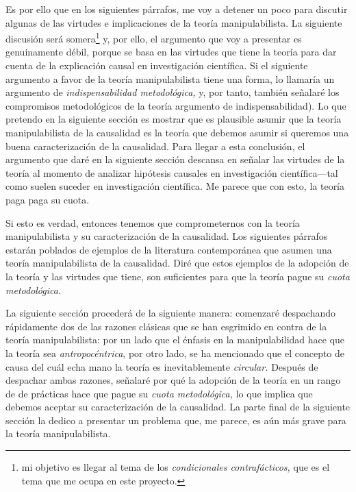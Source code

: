 {{Es por ello que en los siguientes párrafos, me voy a detener
un poco para discutir algunas de las virtudes e
implicaciones de la teoría manipulabilista. La siguiente
discusión será somera\footnote{
  mi objetivo es llegar al tema de los \emph{condicionales
  contrafácticos,} que es el tema que me ocupa en este
  proyecto.
}
y, por ello, el argumento que voy a presentar es genuinamente
débil, porque se basa en las virtudes que tiene la teoría
para dar cuenta de la explicación causal en investigación
científica. Si el siguiente argumento a favor de la teoría
manipulabilista tiene una forma, lo llamaría un argumento de
\emph{indispensabilidad metodológica,} y, por tanto, también
señalaré los compromisos metodológicos de la teoría
argumento de indispensabilidad). Lo que
pretendo en la siguiente sección es mostrar que es plausible asumir que la teoría
manipulabilista de la causalidad es la teoría que debemos
asumir si queremos una buena caracterización de la
causalidad. Para llegar a esta conclusión, el argumento que
daré en la siguiente sección descansa en
señalar las virtudes de la teoría al momento de analizar
hipótesis causales en investigación científica---tal como
suelen suceder en investigación científica. Me parece que
con esto, la teoría paga paga su cuota.

Si esto es verdad, entonces
tenemos que comprometernos con la teoría manipulabilista y
su caracterización de la causalidad. Los siguientes párrafos
estarán poblados de ejemplos de la literatura
contemporánea que asumen una teoría manipulabilista de la
causalidad. Diré que estos ejemplos de la adopción de la
teoría y las virtudes que tiene, son suficientes para que la
teoría pague su \emph{cuota metodológica.}

La siguiente sección procederá de la siguiente manera:
comenzaré despachando rápidamente dos de las razones
clásicas que se han esgrimido en contra de la teoría
manipulabilista: por un lado que el énfasis en la
manipulabilidad hace que la teoría sea
\emph{antropocéntrica}, por otro lado, se ha mencionado
que el concepto de causa del cuál echa mano la teoría es
inevitablemente \emph{circular.} Después de despachar ambas
razones, señalaré por qué la adopción de la teoría en un
rango de de prácticas hace que pague su \emph{cuota
metodológica,} lo que implica que debemos aceptar su
caracterización de la causalidad. La parte final de la
siguiente sección la dedico a presentar un problema que, me
parece, es aún más grave para la teoría manipulabilista.


}}

